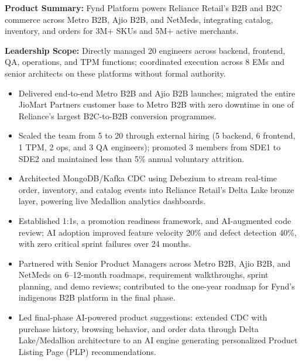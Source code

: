 \textbf{Product Summary:} Fynd Platform powers Reliance Retail's B2B and B2C commerce across Metro B2B, Ajio B2B, and NetMeds, integrating catalog, inventory, and orders for 3M+ SKUs and 5M+ active merchants.\par
\textbf{Leadership Scope:} Directly managed 20 engineers across backend, frontend, QA, operations, and TPM functions; coordinated execution across 8 EMs and senior architects on these platforms without formal authority.\par
{}
\begin{itemize}
\item Delivered end-to-end Metro B2B and Ajio B2B launches; migrated the entire JioMart Partners customer base to Metro B2B with zero downtime in one of Reliance's largest B2C-to-B2B conversion programmes.
\item Scaled the team from 5 to 20 through external hiring (5 backend, 6 frontend, 1 TPM, 2 ops, and 3 QA engineers); promoted 3 members from SDE1 to SDE2 and maintained less than 5\% annual voluntary attrition.
\item Architected MongoDB/Kafka CDC using Debezium to stream real-time order, inventory, and catalog events into Reliance Retail's Delta Lake bronze layer, powering live Medallion analytics dashboards.
\item Established 1:1s, a promotion readiness framework, and AI-augmented code review; AI adoption improved feature velocity 20\% and defect detection 40\%, with zero critical sprint failures over 24 months.
\item Partnered with Senior Product Managers across Metro B2B, Ajio B2B, and NetMeds on 6–12-month roadmaps, requirement walkthroughs, sprint planning, and demo reviews; contributed to the one-year roadmap for Fynd's indigenous B2B platform in the final phase.
\item Led final-phase AI-powered product suggestions: extended CDC with purchase history, browsing behavior, and order data through Delta Lake/Medallion architecture to an AI engine generating personalized Product Listing Page (PLP) recommendations.
\end{itemize}
